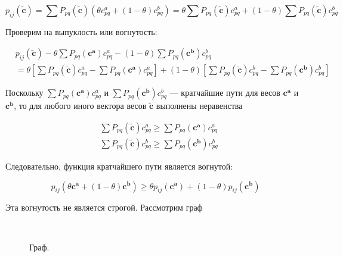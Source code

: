 	\begin{equation}
	p_{ij}(\mathbf{\tilde{c}}) = \sum P_{pq}(\mathbf{\tilde{c}}) (\theta c_{pq}^a + (1 - \theta) c_{pq}^b) = \theta \sum P_{pq}(\mathbf{\tilde{c}}) c_{pq}^a + (1 - \theta) \sum P_{pq}(\mathbf{\tilde{c}})  c_{pq}^b 
	\end{equation}
	
	Проверим на выпуклость или вогнутость:

	\begin{equation}
	\begin{split}
	&p_{ij}(\mathbf{\tilde{c}}) - \theta \sum P_{pq}(\mathbf{c^a}) c_{pq}^a - (1 - \theta) \sum P_{pq}(\mathbf{c^b})  c_{pq}^b \\
	&= \theta \left[ \sum P_{pq}(\mathbf{\tilde{c}}) c_{pq}^a - \sum P_{pq}(\mathbf{c^a}) c_{pq}^a \right]  + (1 - \theta) \left[ \sum P_{pq}(\mathbf{\tilde{c}}) c_{pq}^b - \sum P_{pq}(\mathbf{c^b}) c_{pq}^b\right] 
	\end{split}
	\end{equation}
	
	Поскольку $\sum P_{pq}(\mathbf{c^a}) c_{pq}^a$ и $\sum P_{pq}(\mathbf{c^b}) c_{pq}^b$ --- кратчайшие пути для весов $\mathbf{c^a}$ и $\mathbf{c^b}$, то для любого иного вектора весов $\mathbf{\tilde{c}}$ выполнены неравенства
	
	\begin{equation}
	\begin{split}
	&\sum P_{pq}(\mathbf{\tilde{c}}) c_{pq}^a \geqslant \sum P_{pq}(\mathbf{c^a}) c_{pq}^a \\
	&\sum P_{pq}(\mathbf{\tilde{c}}) c_{pq}^b \geqslant \sum P_{pq}(\mathbf{c^b}) c_{pq}^b
	\end{split}
	\end{equation}	
	
	Следовательно, функция кратчайшего пути является вогнутой:
	
	\begin{equation}
	p_{ij}(\theta \mathbf{c^a} + (1 - \theta) \mathbf{c^b}) \geqslant \theta p_{ij}( \mathbf{c^a}) + (1-\theta ) p_{ij}( \mathbf{c^b}) 
	\end{equation}
	
	Эта вогнутость не является строгой. Рассмотрим граф
	
	\begin{figure}[H]
		\\
		\caption{Граф.}
	\end{figure}
	

